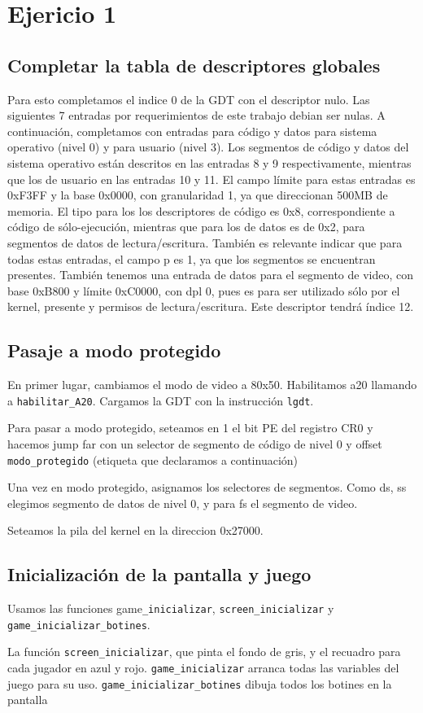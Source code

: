 \section{Ejericio 1}

\subsection{Completar la tabla de descriptores globales}
Para esto completamos el indice 0 de la GDT con el descriptor nulo. Las siguientes 7 entradas por requerimientos de este trabajo debian ser nulas.
A continuación, completamos con entradas para código y datos para sistema operativo (nivel 0) y para usuario (nivel 3). Los segmentos de código y datos del sistema operativo están descritos en las entradas 8 y 9 respectivamente, mientras que los de usuario en las entradas 10 y 11. 
El campo límite para estas entradas es 0xF3FF y la base 0x0000, con granularidad 1, ya que direccionan  500MB de memoria. El tipo para los los descriptores de código es 0x8, correspondiente a código de sólo-ejecución, mientras que para los de datos es de 0x2, para segmentos de datos de lectura/escritura. También es relevante indicar que para todas estas entradas, el campo p es 1, ya que los segmentos se encuentran presentes.
También tenemos una entrada de datos para el segmento de video, con base 0xB800 y límite 0xC0000, con dpl 0, pues es para ser utilizado sólo por el kernel, presente y permisos de lectura/escritura. Este descriptor tendrá índice 12. 

\subsection{Pasaje a modo protegido}
En primer lugar, cambiamos el modo de video a 80x50.
Habilitamos a20 llamando a \texttt{habilitar\_A20}.
Cargamos la GDT  con la instrucción \texttt{lgdt}.

Para pasar a modo protegido, seteamos en 1 el bit PE del registro CR0 y hacemos jump far con un selector de segmento de código de nivel 0 y offset \texttt{modo\_protegido} (etiqueta que declaramos a continuación)

Una vez en modo protegido, asignamos los selectores de segmentos. Como ds, ss elegimos segmento de datos de nivel 0, y para fs el segmento de video.

Seteamos la pila del kernel en la direccion 0x27000.

\subsection{Inicialización de la pantalla y juego}

Usamos las funciones game\texttt{\_inicializar}, \texttt{screen\_inicializar} y \texttt{game\_inicializar\_botines}.

La función \texttt{screen\_inicializar}, que pinta el fondo de gris, y el recuadro para cada jugador en azul y rojo.
\texttt{game\_inicializar} arranca todas las variables del juego para su uso.
\texttt{game\_inicializar\_botines} dibuja todos los botines en la pantalla
